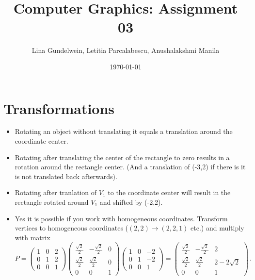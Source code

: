 \documentclass{article}
\title{Computer Graphics: Assignment 03} %
\author{Lina Gundelwein, Letitia Parcalabescu, Anushalakshmi Manila} %
\date{\today} %
\begin{document}
\maketitle 

\section{Transformations} 

\begin{itemize}
\item Rotating an object without translating it equals a translation around the coordinate center.
\item Rotating after translating the center of the rectangle to zero results in a rotation around the rectangle center. (And a translation of (-3,2) if there is it is not translated back afterwards).
\item Rotating after tranlation of $V_1$ to the coordinate center will result in the rectangle rotated around $V_1$ and shifted by (-2,2).
\item Yes it is possible if you work with homogeneous coordinates. Transform vertices to homogeneous coordinates ($(2,2) \rightarrow (2,2,1)$ etc.) and multiply with matrix
\begin{equation*}
P = 
\begin{pmatrix}
1 & 0 &2\\
0 & 1 & 2\\
0 & 0 & 1
\end{pmatrix}
\begin{pmatrix}
\frac{\sqrt{2}}{2} & - \frac{\sqrt{2}}{2} & 0\\
\frac{\sqrt{2}}{2} &  \frac{\sqrt{2}}{2} & 0\\
0 & 0 & 1
\end{pmatrix}
\begin{pmatrix}
1 & 0 &-2\\
0 & 1 &-2\\
0 & 0 & 1
\end{pmatrix}=
\begin{pmatrix}
\frac{\sqrt{2}}{2} & - \frac{\sqrt{2}}{2} & 2\\
\frac{\sqrt{2}}{2} &  \frac{\sqrt{2}}{2} & 2-2\sqrt{2}\\
0 & 0 & 1
\end{pmatrix}\,.
\end{equation*}
\end{itemize}
\end{document}

